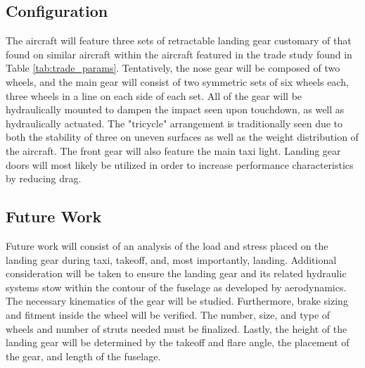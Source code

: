 \subsection{Configuration}
The aircraft will feature three sets of retractable landing gear customary of that found on similar aircraft within the aircraft featured in the trade study found in Table \ref{tab:trade_params}. Tentatively, the nose gear will be composed of two wheels, and the main gear will consist of two symmetric sets of six wheels each, three wheels in a line on each side of each set.  All of the gear will be hydraulically mounted to dampen the impact seen upon touchdown, as well as hydraulically actuated. The "tricycle" arrangement is traditionally seen due to both the stability of three on uneven surfaces as well as the weight distribution of the aircraft.  The front gear will also feature the main taxi light. Landing gear doors will most likely be utilized in order to increase performance characteristics by reducing drag. 

\subsection{Future Work}
Future work will consist of an analysis of the load and stress placed on the landing gear during taxi, takeoff, and, most importantly, landing.  Additional consideration will be taken to ensure the landing gear and its related hydraulic systems stow within the contour of the fuselage as developed by aerodynamics. The necessary kinematics of the gear will be studied. Furthermore, brake sizing and fitment inside the wheel will be verified. The number, size, and type of wheels and number of struts needed must be finalized. Lastly, the height of the landing gear will be determined by the takeoff and flare angle, the placement of the gear, and length of the fuselage.


